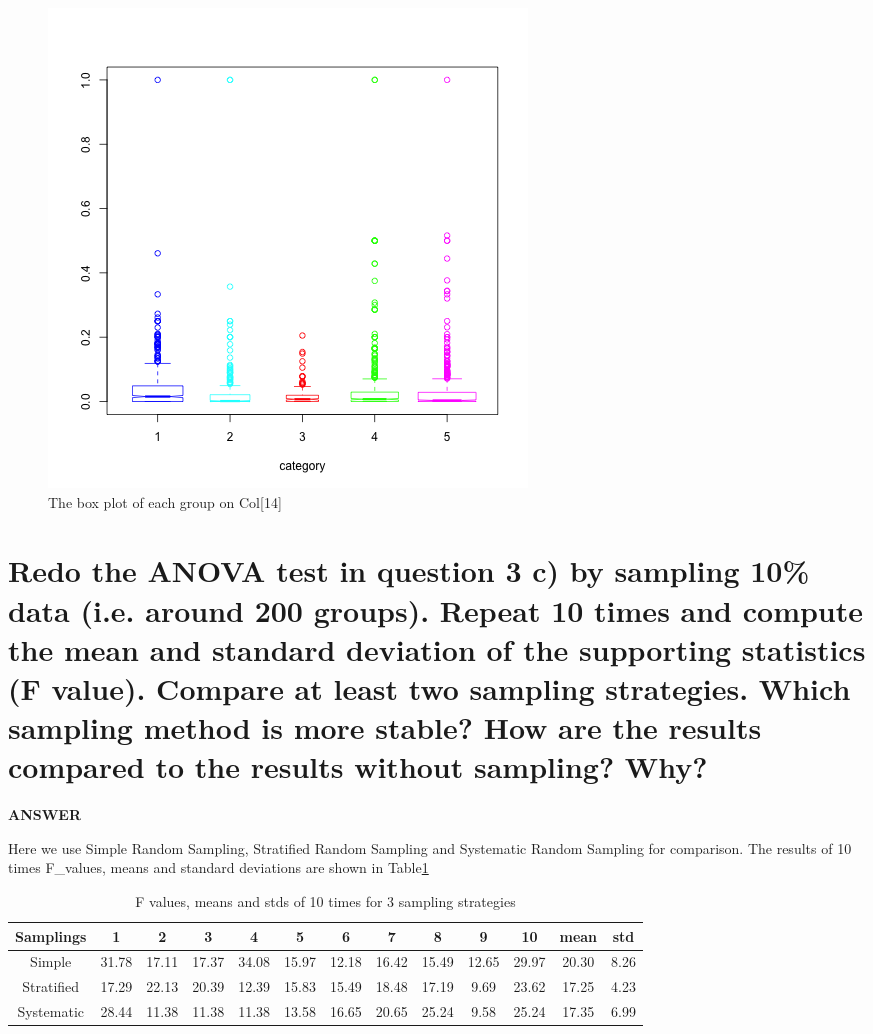 \documentclass[a4paper]{article}
\begin{document}
\begin{figure}[!h]
	\centering
	\includegraphics[width=\linewidth]{images/5b3.png}
	\caption{\label{5b3}The box plot of each group on Col[14]}
\end{figure}



\section{Redo the ANOVA test in question 3 c) by sampling 10\% data (i.e. around 200 groups). Repeat 10 times and compute the mean and standard deviation of the supporting statistics (F value). Compare at least two sampling strategies. Which sampling method is more stable? How are the results compared to the results without sampling? Why?}

\textbf{ANSWER}

Here we use Simple Random Sampling, Stratified Random Sampling and Systematic Random Sampling for comparison. The results of 10 times F\_values, means and standard deviations are shown in Table\ref{tab:table3}

\begin{table}[htbp]
	\centering
	\caption{F values, means and stds of 10 times for 3 sampling strategies}
	\label{tab:table3}
	\begin{tabular}{|c|c|c|c|c|c|c|c|c|c|c|c|c|}
		\hline
		Samplings & 1 &2 &3 &4 &5 &6 & 7 &8 & 9 &10 & mean & std \\
		\hline
		Simple & 31.78 & 17.11 & 17.37 & 34.08 & 15.97 & 12.18 & 16.42 & 15.49 & 12.65 & 29.97 & 20.30 & 8.26\\
		\hline
		Stratified & 17.29 & 22.13 & 20.39 & 12.39 & 15.83 & 15.49 & 18.48 & 17.19 & 9.69 & 23.62 & 17.25 & 4.23\\
		\hline
		Systematic & 28.44 & 11.38 & 11.38 & 11.38 & 13.58 & 16.65 & 20.65 & 25.24 & 9.58 & 25.24 & 17.35 & 6.99 \\
		\hline
	\end{tabular}
\end{table}
\end{document}
